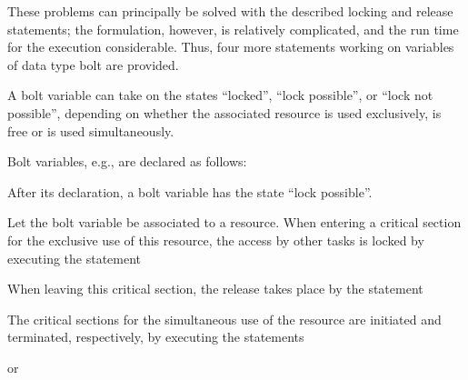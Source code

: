 These problems can principally be solved with the described locking and
release statements; the formulation, however, is relatively
complicated, and the run time for the execution considerable. Thus, four
more statements working on variables of data type bolt are provided.

A bolt variable can take on the states ``locked'', ``lock possible'', or
``lock not possible'', depending on whether the associated resource
is used exclusively, is free or is used simultaneously.

Bolt variables, e.g., are declared as follows:

\code{;}

After its declaration, a bolt variable has the state ``lock possible''.

Let the bolt variable  be associated to a resource. When entering a
critical section for the exclusive use of this resource, the access by
other tasks is locked by executing the statement


When leaving this critical section, the release takes place by the
statement


The critical sections for the simultaneous use of the resource are
initiated and terminated, respectively, by executing the statements

 or 

